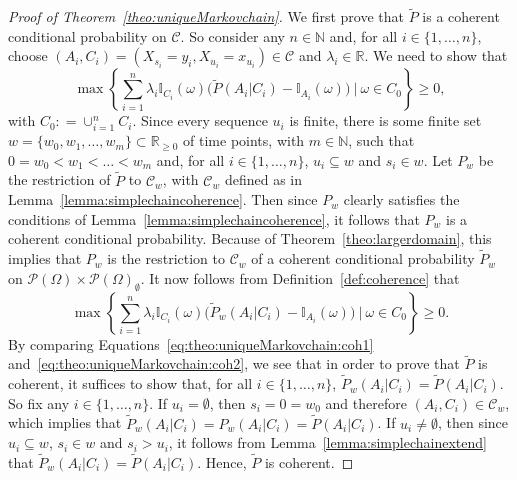 \documentclass[10pt,a4paper]{paper}
\theoremstyle{definition}
\newcommand{\nats}{\mathbb{N}}
\newcommand{\reals}{\mathbb{R}}
\newcommand{\paths}{\Omega}
\newcommand{\power}{\mathcal{P}(\paths)}
\newcommand{\nonemptypower}{\power_{\emptyset}}
\newcommand{\ind}[1]{\mathbb{I}_{#1}}
\newcommand{\coloneqq}{:\!=}
\begin{document}
\begin{proof}[Proof of Theorem~\ref{theo:uniqueMarkovchain}]
We first prove that $\tilde{P}$ is a coherent conditional probability on $\mathcal{C}$. So consider any $n\in\nats$ and, for all $i\in\{1,\dots,n\}$, choose $(A_i,C_i)=(X_{s_i}=y_i,X_{u_i}=x_{u_i})\in\mathcal{C}$ and $\lambda_i\in\reals$. We need to show that
\begin{equation}\label{eq:theo:uniqueMarkovchain:coh1}
\max\left\{\sum_{i=1}^n\lambda_i\ind{C_i}(\omega)\bigl(\tilde{P}(A_i\vert C_i)-\ind{A_i}(\omega)\bigr)~\Bigg\vert~\omega\in C_0\right\}\geq0,
\end{equation}
with $C_0\coloneqq\cup_{i=1}^nC_i$.
Since every sequence $u_i$ is finite, there is some finite set $w=\{w_0,w_1,\dots,w_m\}\subset\reals_{\geq0}$ of time points, with $m\in\nats$, such that $0=w_0<w_1<\dots<w_m$ and, for all $i\in\{1,\dots,n\}$, $u_i\subseteq w$ and $s_i\in w$.
Let $P_w$ be the restriction of $\tilde{P}$ to $\mathcal{C}_w$, with $\mathcal{C}_w$ defined as in Lemma~\ref{lemma:simplechaincoherence}. Then since $P_w$ clearly satisfies the conditions of Lemma~\ref{lemma:simplechaincoherence}, it follows that $P_w$ is a coherent conditional probability. Because of Theorem~\ref{theo:largerdomain}, this implies that $P_w$ is the restriction to $\mathcal{C}_w$ of a coherent conditional probability $\tilde{P}_w$ on $\power\times\nonemptypower$. It now follows from Definition~\ref{def:coherence} that
\begin{equation}\label{eq:theo:uniqueMarkovchain:coh2}
\max\left\{\sum_{i=1}^n\lambda_i\ind{C_i}(\omega)\bigl(\tilde{P}_w(A_i\vert C_i)-\ind{A_i}(\omega)\bigr)~\Bigg\vert~\omega\in C_0\right\}\geq0.
\end{equation}
By comparing Equations~\eqref{eq:theo:uniqueMarkovchain:coh1} and~\eqref{eq:theo:uniqueMarkovchain:coh2}, we see that in order to prove that $\tilde{P}$ is coherent, it suffices to show that, for all $i\in\{1,\dots,n\}$, $\tilde{P}_w(A_i\vert C_i)=\tilde{P}(A_i\vert C_i)$. So fix any $i\in\{1,\dots,n\}$. If $u_i=\emptyset$, then $s_i=0=w_0$ and therefore $(A_i,C_i)\in\mathcal{C}_w$, which implies that $\tilde{P}_w(A_i\vert C_i)=P_w(A_i\vert C_i)=\tilde{P}(A_i\vert C_i)$. If $u_i\neq\emptyset$, then since $u_i\subseteq w$, $s_i\in w$ and $s_i>u_i$, it follows from Lemma~\ref{lemma:simplechainextend} that $\tilde{P}_w(A_i\vert C_i)=\tilde{P}(A_i\vert C_i)$. Hence, $\tilde{P}$ is coherent.




\end{proof}
\end{document}
